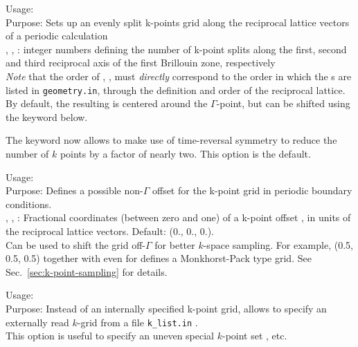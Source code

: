 {
  \noindent
  Usage:     \\[1.0ex]
  Purpose: Sets up an evenly split k-points grid along the reciprocal
    lattice vectors of a periodic calculation \\[1.0ex]
  , ,  : integer numbers defining the
    number of k-point splits along the first, second and third
    reciprocal axis of the first Brillouin zone, respectively \\
}
\emph{Note} that the order of , , 
must \emph{directly} correspond to the order in which the
s are listed in \texttt{geometry.in}, through
the definition and order of the reciprocal lattice. By
default, the resulting  is centered around the
$\Gamma$-point, but can be shifted using the 
keyword below.

The keyword  now allows to make use of
time-reversal symmetry to reduce the number of $k$ points by a factor of
nearly two. This option is the default.

{
  \noindent
  Usage:     \\[1.0ex]
  Purpose: Defines a possible non-$\Gamma$ offset for the k-point grid
    in periodic boundary conditions. \\[1.0ex]
  , ,  : Fractional coordinates
    (between zero and one) of a k-point offset , in units of the
    reciprocal lattice vectors. Default: (0., 0., 0.). \\
}
Can be used to shift the grid off-$\Gamma$ for better $k$-space
sampling. For example, (0.5, 0.5, 0.5) together with even  for
 defines a Monkhorst-Pack
\cite{Monkhorst76} type grid.  See Sec.~\ref{sec:k-point-sampling} for
details.

{
  \noindent
  Usage:  \\[1.0ex]
  Purpose: Instead of an internally specified k-point grid, allows to
    specify an externally read $k$-grid from a file
    \texttt{k\_list.in} .\\
}
This option is useful
to specify an uneven special $k$-point set \cite{Chadi73}, etc.

